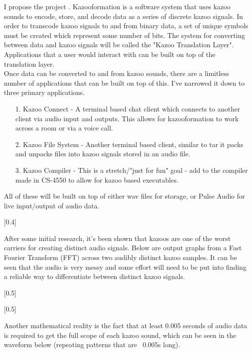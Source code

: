 \documentclass[]{article}
\begin{document}
I propose the project . 
Kazooformation is a software system that uses kazoo sounds to encode, store, and decode data as a series of discrete kazoo signals.
In order to transcode kazoo signals to and from binary data, a set of unique symbols must be created which represent some number of bits.
The system for converting between data and kazoo signals will be called the "Kazoo Translation Layer". Applications that a user would interact with can be built on top of the translation layer. \\


Once data can be converted to and from kazoo sounds, there are a limitless number of applications that can be built on top of this. I've narrowed it down to three primary applications. 


\begin{itemize}
  \item[1.] Kazoo Connect - A terminal based chat client which connects to another client via audio input and outputs. This allows for kazooformation to work across a room or via a voice call.
  \item[2.] Kazoo File System - Another terminal based client, similar to tar it packs and unpacks files into kazoo signals stored in an audio file.
  \item[3.] Kazoo Compiler - This is a stretch/"just for fun" goal - add to the compiler made in CS-4550 to allow for kazoo based executables.
\end{itemize}

All of these will be built on top of either wav files for storage, or Pulse Audio for live input/output of audio data.

[0.4\textwidth]

After some initial research, it's been shown that kazoos are one of the worst carriers for creating distinct audio signals. Below are output graphs from a Fast Fourier Transform (FFT) across two audibly distinct kazoo samples. It can be seen that the audio is very messy and some effort will need to be put into finding a reliable way to differentiate between distinct kazoo signals.

[0.5\textwidth]

[0.5\textwidth]

Another mathematical reality is the fact that at least 0.005 seconds of audio data is required to get the full scope of each kazoo sound, which can be seen in the waveform below (repeating patterns that are ~0.005s long).
\end{document}
